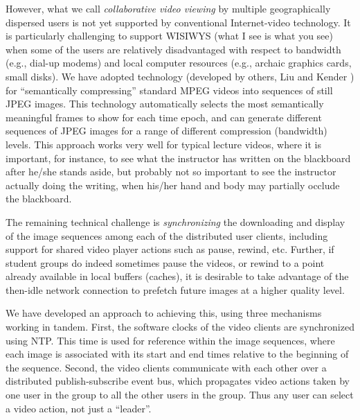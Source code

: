 \documentclass{sig-alternate}
\begin{document}

However, what we call {\em collaborative video viewing} by multiple
geographically dispersed users is not yet supported by conventional
Internet-video technology.  It is particularly challenging to support
WISIWYS (what I see is what you see) when some of the users are
relatively disadvantaged with respect to bandwidth (e.g., dial-up
modems) and local computer resources (e.g., archaic graphics cards,
small disks).  We have adopted technology (developed by others, Liu
and Kender \cite{TIECHENG}) for ``semantically compressing'' standard
MPEG videos into sequences of still JPEG images.  This technology
automatically selects the most semantically meaningful frames to show
for each time epoch, and can generate different sequences of JPEG
images for a range of different compression (bandwidth) levels.  This
approach works very well for typical lecture videos, where it is
important, for instance, to see what the instructor has written on the
blackboard after he/she stands aside, but probably not so important to
see the instructor actually doing the writing, when his/her hand and
body may partially occlude the blackboard.

The remaining technical challenge is {\em synchronizing} the
downloading and display of the image sequences among each of the
distributed user clients, including support for shared video player
actions such as pause, rewind, etc.  Further, if student groups do
indeed sometimes pause the videos, or rewind to a point already
available in local buffers (caches), it is desirable to take advantage
of the then-idle network connection to prefetch future images at a
higher quality level.


We have developed an approach to achieving this, using three
mechanisms working in tandem.  First, the software clocks of the video
clients are synchronized using NTP.  This time is used for reference
within the image sequences, where each image is associated with its
start and end times relative to the beginning of the sequence.
Second, the video clients communicate with each other over a
distributed publish-subscribe event bus, which propagates video
actions taken by one user in the group to all the other users in the
group.  Thus any user can select a video action, not just a
``leader''.
\end{document}
